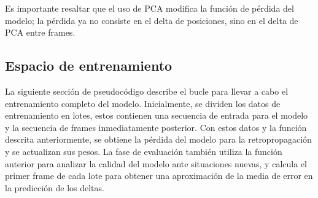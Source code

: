 Es importante resaltar que el uso de PCA modifica la función de pérdida del modelo; la pérdida ya no consiste en el delta de posiciones, sino en el delta de PCA entre frames.

\subsection{Espacio de entrenamiento}
La siguiente sección de pseudocódigo describe el bucle para llevar a cabo el entrenamiento completo del modelo. Inicialmente, se dividen los datos de entrenamiento en lotes, estos contienen una secuencia de entrada para el modelo y la secuencia de frames inmediatamente posterior. Con estos datos y la función descrita anteriormente, se obtiene la pérdida del modelo para la retropropagación y se actualizan sus pesos. La fase de evaluación también utiliza la función anterior para analizar la calidad del modelo ante situaciones nuevas, y calcula el primer frame de cada lote para obtener una aproximación de la media de error en la predicción de los deltas.


